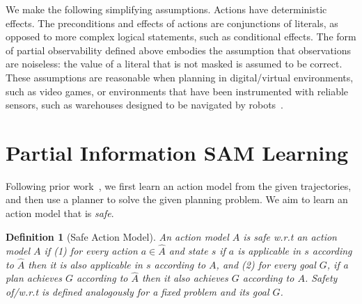 \documentclass[letterpaper]{article} %
\newtheorem{definition}{Definition}
\begin{document}
We make the following simplifying assumptions.
Actions have deterministic effects.
The preconditions and effects of actions are conjunctions of literals, as opposed to more complex logical statements, such as conditional effects.
The form of partial observability defined above embodies the assumption that observations are noiseless: the value of a literal that is not masked is assumed to be correct.
These assumptions are reasonable when planning in digital/virtual environments, such as video games, or environments that have been instrumented with reliable sensors, such as warehouses designed to be navigated by robots~\citep{li2020lifelong}.






\section{Partial Information SAM Learning}
Following prior work~\citep{stern2017efficientAndSafe,juba2021safe},
we first learn an action model from the given trajectories, and then use a planner to solve the given planning problem.
We aim to learn an action model that is \emph{safe}.
\begin{definition}[Safe Action Model]
An action model $\hat{A}$ is safe w.r.t an action model $A$
if (1) for every action $a\in\hat{A}$ and state $s$ if $a$ is applicable in $s$ according to $\hat{A}$ then it is also applicable in $s$ according to $A$,
and (2) for every goal $G$, if a plan achieves $G$ according to $\hat{A}$ then it also achieves $G$ according to $A$. Safety of/w.r.t is defined analogously for a fixed problem and its goal $G$.
\label{def:safe-action-model}
\end{definition}

\end{document}
